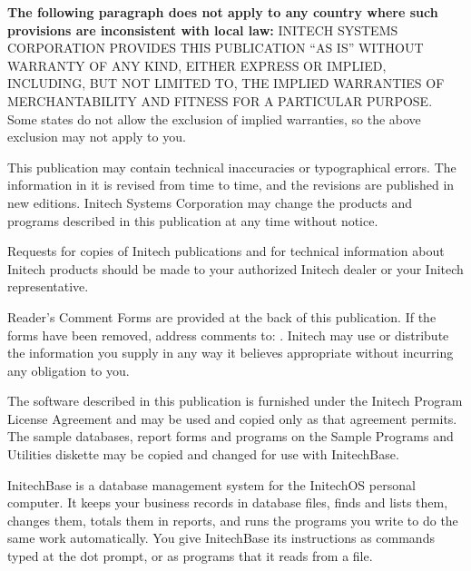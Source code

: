 \begin{TitleVerso}
{\imLegalFont
\textbf{The following paragraph does not apply to any country where such
provisions are inconsistent with local law:} INITECH SYSTEMS CORPORATION
PROVIDES THIS PUBLICATION ``AS IS'' WITHOUT WARRANTY OF ANY KIND, EITHER
EXPRESS OR IMPLIED, INCLUDING, BUT NOT LIMITED TO, THE IMPLIED WARRANTIES OF
MERCHANTABILITY AND FITNESS FOR A PARTICULAR PURPOSE.  Some states do not
allow the exclusion of implied warranties, so the above exclusion may not
apply to you.\par
This publication may contain technical inaccuracies or typographical errors.
The information in it is revised from time to time, and the revisions are
published in new editions.  Initech Systems Corporation may change the
products and programs described in this publication at any time without
notice.\par
Requests for copies of Initech publications and for technical information
about Initech products should be made to your authorized Initech dealer or
your Initech representative.\par}

{\footnotesize
Reader's Comment Forms are provided at the back of this publication.  If the
forms have been removed, address comments to: \InitechAddressLine.
Initech may use or distribute the information you supply in any way it
believes appropriate without incurring any obligation to you.\par
The software described in this publication is furnished under the Initech
Program License Agreement and may be used and copied only as that agreement
permits.  The sample databases, report forms and programs on the Sample
Programs and Utilities diskette may be copied and changed for use with
InitechBase.\par}
\end{TitleVerso}

InitechBase\tm{} is a database management system for the InitechOS\tm{}
personal computer.  It keeps your business records in database files, finds
and lists them, changes them, totals them in reports, and runs the programs
you write to do the same work automatically.  You give InitechBase its
instructions as commands typed at the dot prompt, or as programs that it
reads from a file.

